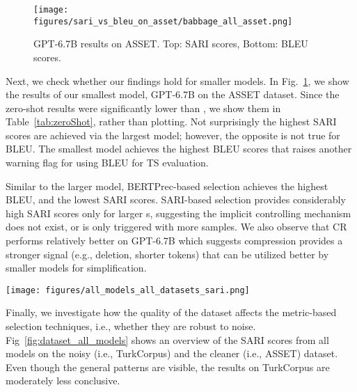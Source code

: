 \documentclass[11pt]{article}
\begin{document}
\begin{figure}[]
    \centering
    \texttt{[image: figures/sari\_vs\_bleu\_on\_asset/babbage\_all\_asset.png]}
    \caption{GPT-6.7B results on ASSET. Top: SARI scores, Bottom: BLEU scores.}
    \label{fig:babbage_asset_all}
\end{figure}

Next, we check whether our findings hold for smaller models. In Fig.~\ref{fig:babbage_asset_all}, we show the results of our smallest model, GPT-6.7B on the ASSET dataset. Since the zero-shot results were significantly lower than , we show them in Table~\ref{tab:zeroShot}, rather than plotting. Not surprisingly the highest SARI scores are achieved via the largest model; however, the opposite is not true for BLEU. The smallest model achieves the highest BLEU scores that raises another warning flag for using BLEU for TS evaluation. 

Similar to the larger model, BERTPrec-based selection achieves the highest BLEU, and the lowest SARI scores. SARI-based selection provides considerably high SARI scores only for larger s, suggesting the implicit controlling mechanism does not exist, or is only triggered with more samples. We also observe that CR performs relatively better on GPT-6.7B which suggests compression provides a stronger signal (e.g., deletion, shorter tokens) that can be utilized better by smaller models for simplification. 

\begin{figure*}[ht]
    \centering  
    \texttt{[image: figures/all\_models\_all\_datasets\_sari.png]}
    \caption{SARI scores for GPT-B, GPT-B and GPT-B models on ASSET (top) and TurkCorpus (bottom) datasets. See App.~\ref{sec:bleuresults} for BLEU scores.}
    \label{fig:dataset_all_models}
\end{figure*}

Finally, we investigate how the quality of the dataset affects the metric-based selection techniques, i.e., whether they are robust to noise. Fig~\ref{fig:dataset_all_models} shows an overview of the SARI scores from all models on the noisy (i.e., TurkCorpus) and the cleaner (i.e., ASSET) dataset. Even though the general patterns are visible, the results on TurkCorpus are moderately less conclusive. 
\end{document}

